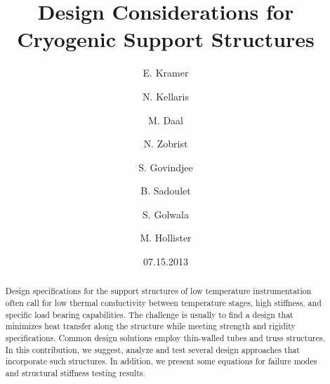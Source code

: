 \documentclass[final]{svjour2}
\begin{document}
\newcommand{\hdblarrow}{H\makebox[0.9ex][l]{$\downdownarrows$}-}
\title{Design Considerations for Cryogenic Support Structures}

\author{E. Kramer \and N. Kellaris  \and M. Daal \and N. Zobrist \and S. Govindjee \and B. Sadoulet \and S. Golwala \and M. Hollister}


\date{07.15.2013}

\maketitle

\begin{abstract}

Design specifications for the support structures of low temperature instrumentation often call for low thermal conductivity between temperature stages, high stiffness, and specific load bearing capabilities. The challenge is usually to find a design that minimizes heat transfer along the structure while meeting strength and rigidity specifications.  Common design solutions employ thin-walled tubes and truss structures. In this contribution, we suggest, analyze and test several design approaches that incorporate such structures. In addition, we present some equations for failure modes and structural stiffness testing results.


\end{abstract}
\end{document}
